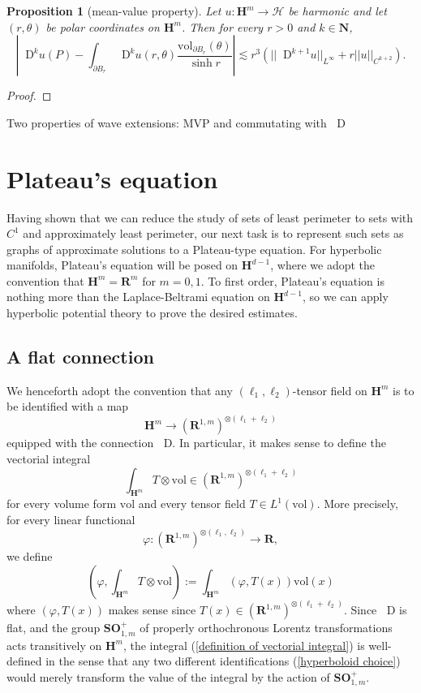 \documentclass[reqno,12pt,letterpaper]{amsart}
\newcommand{\NN}{\mathbf{N}}
\newcommand{\RR}{\mathbf{R}}
\newcommand{\Hyp}{\mathbf H}
\newcommand{\SpOrth}{\mathbf{SO}}
\newcommand*\Dif{\mathop{}\!\mathrm{D}}
\newcommand{\Hilb}{\mathcal H}
\newcommand{\vol}{\mathrm{vol}}
\newtheorem{proposition}[theorem]{Proposition}
\theoremstyle{definition}
\numberwithin{equation}{section}
\begin{document}
\begin{proposition}[mean-value property]
Let $u: \Hyp^m \to \Hilb$ be harmonic and let $(r, \theta)$ be polar coordinates on $\Hyp^m$.
Then for every $r > 0$ and $k \in \NN$,
$$\left|\Dif^k u(P) - \int_{\partial B_r} \Dif^k u(r, \theta) \frac{\vol_{\partial B_r}(\theta)}{\sinh r}\right| \lesssim r^3(||\Dif^{k + 1} u||_{L^\infty} + r ||u||_{C^{k + 2}}).$$
\end{proposition}
\begin{proof}

\end{proof}

Two properties of wave extensions: MVP and commutating with $\Dif$


\section{Plateau's equation}\label{Plateau section}
Having shown that we can reduce the study of sets of least perimeter to sets with $C^1$ and approximately least perimeter, our next task is to represent such sets as graphs of approximate solutions to a Plateau-type equation.
For hyperbolic manifolds, Plateau's equation will be posed on $\Hyp^{d - 1}$, where we adopt the convention that $\Hyp^m = \RR^m$ for $m = 0, 1$.
To first order, Plateau's equation is nothing more than the Laplace-Beltrami equation on $\Hyp^{d - 1}$, so we can apply hyperbolic potential theory to prove the desired estimates.

\subsection{A flat connection}
We henceforth adopt the convention that any $(\ell_1, \ell_2)$-tensor field on $\Hyp^m$ is to be identified with a map
$$\Hyp^m \to (\RR^{1, m})^{\otimes(\ell_1 + \ell_2)}$$
equipped with the connection $\Dif$.
In particular, it makes sense to define the vectorial integral
\begin{equation}\label{definition of vectorial integral}
\int_{\Hyp^m} T \otimes \vol \in (\RR^{1, m})^{\otimes (\ell_1 + \ell_2)}
\end{equation}
for every volume form $\vol$ and every tensor field $T \in L^1(\vol)$. More precisely, for every linear functional
$$\varphi: (\RR^{1, m})^{\otimes(\ell_1, \ell_2)} \to \RR,$$
we define
$$\left(\varphi, \int_{\Hyp^m} T \otimes \vol\right) := \int_{\Hyp^m} (\varphi, T(x)) \vol(x)$$
where $(\varphi, T(x))$ makes sense since $T(x) \in (\RR^{1, m})^{\otimes (\ell_1 + \ell_2)}$.
Since $\Dif$ is flat, and the group $\SpOrth^+_{1, m}$ of properly orthochronous Lorentz transformations acts transitively on $\Hyp^m$, the integral (\ref{definition of vectorial integral}) is well-defined in the sense that any two different identifications (\ref{hyperboloid choice}) would merely transform the value of the integral by the action of $\SpOrth^+_{1, m}$.
\end{document}
